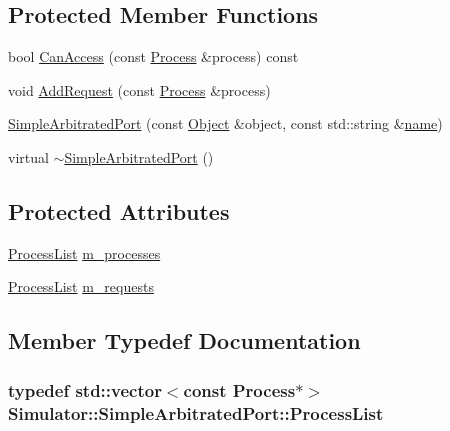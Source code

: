 \subsection*{Protected Member Functions}
\begin{DoxyCompactItemize}
\item 
bool \hyperlink{class_simulator_1_1_simple_arbitrated_port_a283631d9581d3370b68d67d534217fff}{Can\+Access} (const \hyperlink{class_simulator_1_1_process}{Process} \&process) const 
\item 
void \hyperlink{class_simulator_1_1_simple_arbitrated_port_af1264a0fcf4948196c2fde1674e0926d}{Add\+Request} (const \hyperlink{class_simulator_1_1_process}{Process} \&process)
\item 
\hyperlink{class_simulator_1_1_simple_arbitrated_port_afd399abef86bdb1f46b9fee2bd4a6685}{Simple\+Arbitrated\+Port} (const \hyperlink{class_simulator_1_1_object}{Object} \&object, const std\+::string \&\hyperlink{mtconf_8c_a8f8f80d37794cde9472343e4487ba3eb}{name})
\item 
virtual \hyperlink{class_simulator_1_1_simple_arbitrated_port_a6b53cb380559a6415f368533c252c78b}{$\sim$\+Simple\+Arbitrated\+Port} ()
\end{DoxyCompactItemize}
\subsection*{Protected Attributes}
\begin{DoxyCompactItemize}
\item 
\hyperlink{class_simulator_1_1_simple_arbitrated_port_a279e689b99bb2c7b2b2b0605979c14de}{Process\+List} \hyperlink{class_simulator_1_1_simple_arbitrated_port_a4f5b3c1a0db69be09a10d5a4b77410be}{m\+\_\+processes}
\item 
\hyperlink{class_simulator_1_1_simple_arbitrated_port_a279e689b99bb2c7b2b2b0605979c14de}{Process\+List} \hyperlink{class_simulator_1_1_simple_arbitrated_port_a7183fea61fa2419b2e2edbddbc9f50d0}{m\+\_\+requests}
\end{DoxyCompactItemize}


\subsection{Member Typedef Documentation}
\hypertarget{class_simulator_1_1_simple_arbitrated_port_a279e689b99bb2c7b2b2b0605979c14de}{
\subsubsection[{Process\+List}]{\setlength{\rightskip}{0pt plus 5cm}typedef std\+::vector$<$const {\bf Process}$\ast$$>$ {\bf Simulator\+::\+Simple\+Arbitrated\+Port\+::\+Process\+List}\hspace{0.3cm}{\ttfamily [protected]}}}\label{class_simulator_1_1_simple_arbitrated_port_a279e689b99bb2c7b2b2b0605979c14de}


